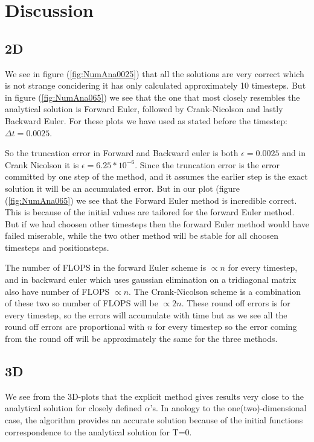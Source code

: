 \documentclass[a4paper,10pt]{article}
\begin{document}
\section{Discussion}
\subsection{2D}
We see in figure (\ref{fig:NumAna0025}) that all the solutions are very correct which is not strange concidering it has only calculated approximately 10 timesteps.
But in figure (\ref{fig:NumAna065}) we see that the one that most closely resembles the analytical solution is Forward Euler, followed by Crank-Nicolson and lastly Backward Euler. 
For these plots we have used as stated before the timestep: $\Delta t = 0.0025$.

So the truncation error in Forward and Backward euler is both $\epsilon = 0.0025$ and in Crank Nicolson it is $\epsilon = 6.25*10^{-6}$. 
Since the truncation error is the error committed by one step of the method, and it assumes the earlier step is the exact solution it will be an accumulated error.
But in our plot (figure (\ref{fig:NumAna065}) we see that the Forward Euler method is incredible correct. This is because of the initial values are 
tailored for the forward Euler method. But if we had choosen other timesteps then the forward Euler method would have failed miserable, while the
two other method will be stable for all choosen timesteps and positionsteps. 


The number of FLOPS in the forward Euler scheme is $\propto n$ for every timestep, and in backward euler which uses gaussian elimination on a tridiagonal matrix also have number of FLOPS
$\propto n$. The Crank-Nicolson scheme is a combination of these two so number of FLOPS will be $\propto 2n$. These round off errors is for every timestep, so the
errors will accumulate with time but as we see all the round off errors are proportional with $n$ for every timestep so the error coming from the round
off will be approximately the same for the three methods.

\subsection{3D}
We see from the 3D-plots that the explicit method gives results very close to the analytical solution for closely defined $\alpha$'s. In anology to the one(two)-dimensional case, the algorithm provides an accurate solution because of the initial functions correspondence to the analytical solution for T=0. 
\end{document}

